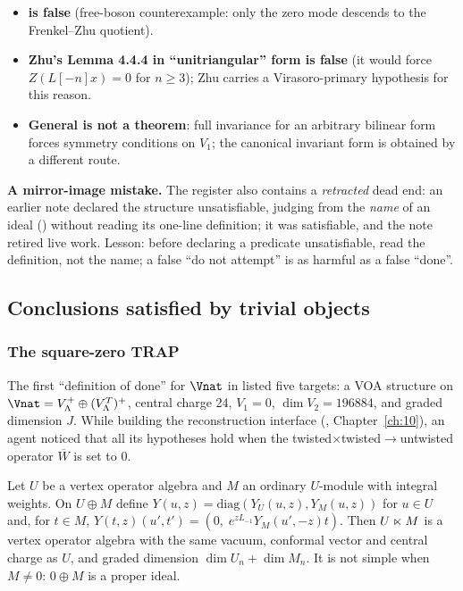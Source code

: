 \begin{itemize}
  $A(V)$-module to be finite-dimensional, false for $A(V^k(\mathfrak{sl}_2))\cong U(\mathfrak{sl}_2)$;
  now scoped under finite-dimensionality of $A(V)$.
\item \textbf{ is false} (free-boson counterexample: only the zero mode
  descends to the Frenkel--Zhu quotient).
\item \textbf{Zhu's Lemma 4.4.4 in ``unitriangular'' form is false} (it would force
  $Z(L[-n]x)=0$ for $n\ge3$); Zhu carries a Virasoro-primary hypothesis for this reason.
\item \textbf{General  is not a theorem}: full invariance for an arbitrary
  bilinear form forces symmetry conditions on $V_1$; the canonical invariant form is obtained by a
  different route.
\end{itemize}

\begin{warning}
\textbf{A mirror-image mistake.} The register also contains a \emph{retracted} dead end: an earlier
note declared the structure  unsatisfiable, judging from the \emph{name} of
an ideal () without reading its one-line definition; it was satisfiable, and the
note retired live work. Lesson: before declaring a predicate
unsatisfiable, read the definition, not the name; a false ``do not attempt'' is as harmful as a
false ``done''.
\end{warning}

\subsection{Conclusions satisfied by trivial objects}

\subsubsection{The square-zero TRAP}\label{ch15:sec:trap-sqzero}

The first ``definition of done'' for $\Vnat$ in  listed five
targets: a VOA structure on $\Vnat=V_\Lambda^+\oplus(V_\Lambda^T)^+$, central charge 24,
$V_1=0$, $\dim V_2=196884$, and graded dimension $J$. While building the reconstruction interface
(, Chapter~\ref{ch:10}), an agent noticed that all its hypotheses hold when the
twisted$\times$twisted$\to$untwisted operator $\overline W$ is set to $0$.

\begin{proposition}\label{ch15:prop:sqzero}
Let $U$ be a vertex operator algebra and $M$ an ordinary $U$-module with integral weights. On
$U\oplus M$ define $Y(u,z)=\mathrm{diag}(Y_U(u,z),Y_M(u,z))$ for $u\in U$ and, for $t\in M$,
$Y(t,z)(u',t')=(0,\;e^{zL_{-1}}Y_M(u',-z)t)$. Then $U\mathbin{\ltimes} M$ is a vertex operator algebra with
the same vacuum, conformal vector and central charge as $U$, and graded dimension
$\dim U_n+\dim M_n$. It is not simple when $M\ne0$: $0\oplus M$ is a proper ideal.
\end{proposition}

